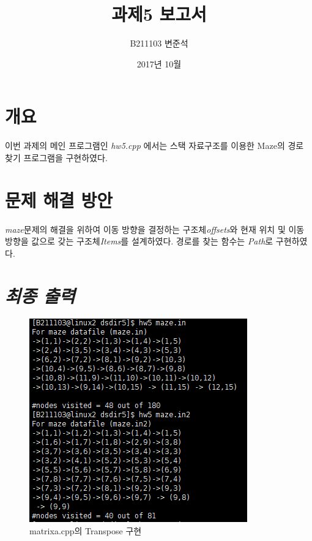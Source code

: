 \documentclass[a4paper,12pt]{article}
\begin{document}
 

\title{과제5 보고서}
\author{B211103 변준석}
\date{2017년 10월}
\maketitle

\newpage
\section{개요}
이번 과제의 메인 프로그램인 \textsl{hw5.cpp} 에서는 스택 자료구조를 이용한 Maze의 경로 찾기 프로그램을 구현하였다.

\section{문제 해결 방안}
\textsl{maze}문제의 해결을 위하여 이동 방향을 결정하는 구조체\textsl{offsets}와 현재 위치 및 이동 방향을 값으로 갖는 구조체\textsl{Items}를 설계하였다. 경로를 찾는 함수는 \textsl{Path}로 구현하였다.

\section{\textsl{최종 출력}}
\newpage
\begin{figure}[t]\vspace*{4pt} 
\centerline{\includegraphics[width=1.0\columnwidth]{result}} 
\caption{matrixa.cpp의 Transpose 구현}\vspace*{-6pt} 
\label{figure:matrixa} 
\end{figure} 
\end{document}
